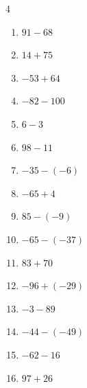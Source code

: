 \begin{multicols}{4}
\begin{enumerate}
        \phantom{$=-113$}

  \item $91-68$

        \phantom{$=23$}

  \item $14+75$

        \phantom{$=89$}

  \item $-53+64$

        \phantom{$=11$}

  \item $-82-100$

        \phantom{$=-182$}

  \item $6-3$

        \phantom{$=3$}

\columnbreak %

  \item $98-11$

        \phantom{$=87$}

  \item $-35-(-6)$

        \phantom{$=-29$}

  \item $-65+4$

        \phantom{$=-61$}

  \item $85-(-9)$

        \phantom{$=94$}

  \item $-65-(-37)$

        \phantom{$=-28$}

  \item $83+70$

        \phantom{$=153$}

  \item $-96+(-29)$

        \phantom{$=-125$}

  \item $-3-89$

        \phantom{$=-92$}

  \item $-44-(-49)$

        \phantom{$=5$}

  \item $-62-16$

        \phantom{$=-78$}

  \item $97+26$


\end{enumerate}
\end{multicols}
